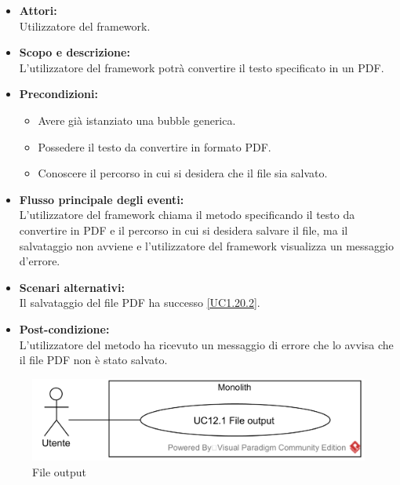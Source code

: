 \begin{itemize}
	\item \textbf{Attori:}
	\\Utilizzatore del framework.
	\item \textbf{Scopo e descrizione:} 
	\\L'utilizzatore del framework potrà convertire il testo specificato in un PDF.
	\item \textbf{Precondizioni:}
	\begin{itemize}
		\item Avere già istanziato una bubble generica.
		\item Possedere il testo da convertire in formato PDF.
		\item Conoscere il percorso in cui si desidera che il file sia salvato.
	\end{itemize}
	\item \textbf{Flusso principale degli eventi:}
	\\L'utilizzatore del framework chiama il metodo specificando il testo da convertire in PDF e il percorso in cui si desidera salvare il file, ma il salvataggio non avviene e l'utilizzatore del framework visualizza un messaggio d'errore.
	\item \textbf{Scenari alternativi:}
	\\Il salvataggio del file PDF ha successo \ref{UC1.20.2}.
	\item \textbf{Post-condizione:}
	\\L'utilizzatore del metodo ha ricevuto un messaggio di errore che lo avvisa che il file PDF non è stato salvato.
\end{itemize}

\begin{samepage}
\isfirsttrue
{}
\nopagebreak
\begin{figure}[H]
	\centering
	\includegraphics[width=15cm]{../../documenti/AnalisiDeiRequisiti/Diagrammi_img/usecase/uc1_24.png}
	\caption{\UCCCaption{} File output}
\end{figure}
\end{samepage}


